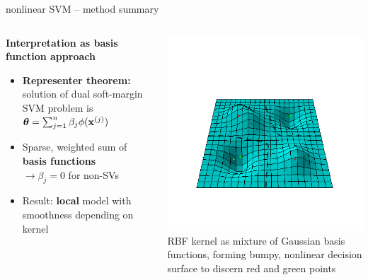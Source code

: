 \documentclass[11pt,compress,t,notes=noshow, xcolor=table]{beamer}
\newcommand{\highlight}[1]{\textcolor{hlcol}{\textbf{#1}}}
\begin{document}
\begin{vbframe}{nonlinear SVM -- method summary}
\begin{columns}[T, totalwidth=\textwidth]
\begin{column}{0.59\textwidth}
\highlight{Interpretation as basis function approach}
  \begin{itemize}
    \item \textbf{Representer theorem:} solution of dual soft-margin SVM problem is
    $\thetav = \sum_{j=1}^n \beta_j \phi (\xi[j] )$ \\
    \item Sparse, weighted sum of \textbf{basis functions}\\
    $\rightarrow \beta_j = 0$ 
    for non-SVs
    \item Result: \textbf{local} model with smoothness depending on kernel
  \end{itemize}
    \end{column}
        \begin{column}{0.4\textwidth}
        \centering
  \includegraphics[width=\textwidth, trim=50 100 50 150, clip]{
  figure/svm_rbf_as_basis.png} \\
  \tiny{RBF kernel as mixture of Gaussian basis functions, forming
  bumpy, nonlinear decision surface to discern red and green points}
    \end{column}
\end{columns}

\end{vbframe}
\end{document}
